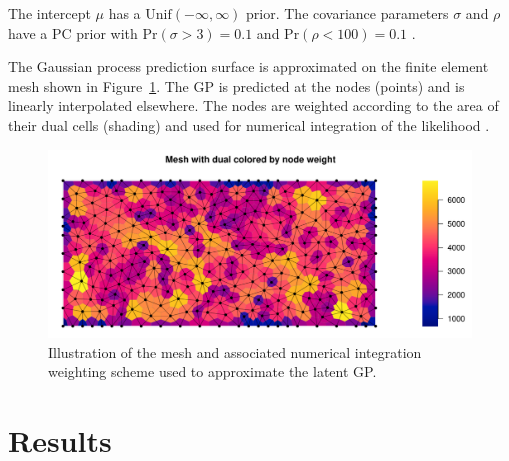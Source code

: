 \documentclass[review]{elsarticle}
\begin{document}
The intercept \(\mu\) has a \(\mathrm{Unif}(-\infty, \infty)\) prior.
The covariance parameters \(\sigma\) and \(\rho\) have a PC prior with
\(\mathrm{Pr}(\sigma > 3) = 0.1\) and \(\mathrm{Pr}(\rho < 100) = 0.1\)
\citep{fuglstadetal,simpsonpc}.

The Gaussian process prediction surface is approximated on the finite element
mesh shown in Figure~\ref{meshfull}. The GP is predicted at the nodes (points)
and is linearly interpolated elsewhere. The nodes are weighted according to
the area of their dual cells (shading) and used for numerical integration of
the likelihood \citep{lindgrenetal}.

\begin{figure}
\includegraphics[width=5in]{../graphics/mesh_full.pdf}
\caption{Illustration of the mesh and associated numerical integration
weighting scheme used to approximate the latent GP.}
\label{meshfull}
\end{figure}




\section{Results}


\end{document}
